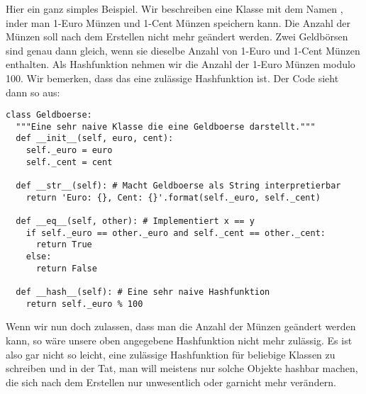 Hier ein ganz simples Beispiel.
Wir beschreiben eine Klasse mit dem Namen , inder man 1-Euro Münzen und 1-Cent Münzen speichern kann.
Die Anzahl der Münzen soll nach dem Erstellen nicht mehr geändert werden.
Zwei Geldbörsen sind genau dann gleich, wenn sie dieselbe Anzahl von 1-Euro und 1-Cent Münzen enthalten.
Als Hashfunktion nehmen wir die Anzahl der 1-Euro Münzen modulo 100.
Wir bemerken, dass das eine zulässige Hashfunktion ist.
Der Code sieht dann so aus:
\begin{lstlisting}
class Geldboerse:
  """Eine sehr naive Klasse die eine Geldboerse darstellt."""
  def __init__(self, euro, cent):
    self._euro = euro
    self._cent = cent
  
  def __str__(self): # Macht Geldboerse als String interpretierbar
    return 'Euro: {}, Cent: {}'.format(self._euro, self._cent)
  
  def __eq__(self, other): # Implementiert x == y
    if self._euro == other._euro and self._cent == other._cent:
      return True
    else:
      return False
  
  def __hash__(self): # Eine sehr naive Hashfunktion
    return self._euro % 100
\end{lstlisting}

Wenn wir nun doch zulassen, dass man die Anzahl der Münzen geändert werden kann,
so wäre unsere oben angegebene Hashfunktion nicht mehr zulässig.
Es ist also gar nicht so leicht, eine zulässige Hashfunktion für beliebige Klassen zu schreiben und in der Tat,
man will meistens nur solche Objekte hashbar machen, die sich nach dem Erstellen nur unwesentlich oder garnicht mehr verändern.

